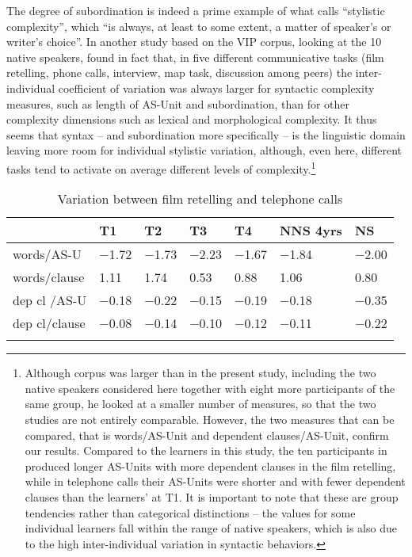\documentclass[output=paper]{langscibook}
\begin{document}
The degree of subordination is indeed a prime example of what \citet[120]{Pallotti2015} calls “stylistic complexity”, which “is always, at least to some extent, a matter of speaker’s or writer’s choice”. In another study based on the VIP corpus, looking at the 10 native speakers, \citet{Pallotti2019} found in fact that, in five different communicative tasks (film retelling, phone calls, interview, map task, discussion among peers) the inter-individual coefficient of variation was always larger for syntactic complexity measures, such as length of AS-Unit and subordination, than for other complexity dimensions such as lexical and morphological complexity. It thus seems that syntax – and subordination more specifically – is the linguistic domain leaving more room for individual stylistic variation, although, even here, different tasks tend to activate on average different levels of complexity.\footnote{Although  corpus was larger than in the present study, including the two native speakers considered here together with eight more participants of the same group, he looked at a smaller number of measures, so that the two studies are not entirely comparable. However, the two measures that can be compared, that is words/AS-Unit and dependent clauses/AS-Unit, confirm our results. Compared to the learners in this study, the ten participants in \citet{Pallotti2019} produced longer AS-Units with more dependent clauses in the film retelling, while in telephone calls  their AS-Units were shorter and with fewer dependent clauses than the learners’ at T1. It is important to note that these are group tendencies rather than categorical distinctions -- the values for some individual learners fall within the range of native speakers, which is also due to the high inter-individual variation in syntactic behaviors.}

\begin{table}
\begin{tabularx}{\textwidth}{lYYYYYY} 
\lsptoprule
& {T1} & {T2} & {T3} & {T4} & {NNS 4yrs} & {NS}\\\midrule
words/AS-U & {}$-$1.72 & {}$-$1.73 & {}$-$2.23 & {}$-$1.67 & {}$-$1.84 & {}$-$2.00\\
words/clause & 1.11 & 1.74 & 0.53 & 0.88 & 1.06 & 0.80\\
dep cl /AS-U & {}$-$0.18 & {}$-$0.22 & {}$-$0.15 & {}$-$0.19 & {}$-$0.18 & {}$-$0.35\\
dep cl/clause & {}$-$0.08 & {}$-$0.14 & {}$-$0.10 & {}$-$0.12 & {}$-$0.11 & {}$-$0.22\\
\lspbottomrule
\end{tabularx}
\caption{Variation between film retelling and telephone calls}
\label{tab:pallotti:4}
\end{table}
\end{document}
